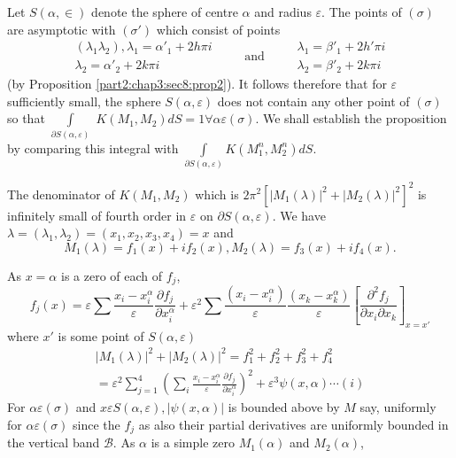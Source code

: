 Let $S(\alpha,  \in)$ denote the sphere of centre $\alpha$ and radius
$\varepsilon $. The points of $(\sigma)$ are asymptotic with $(\sigma')$ which
consist of points 
$$
\begin{aligned}
(\lambda_1\lambda_2), \lambda_1 = \alpha'_1 + 2h \pi i \\ 
  \lambda_2 = \alpha'_2+ 2 k \pi i
\end{aligned}
\qquad ~\text{and}~ \qquad 
\begin{aligned} 
  \lambda_1 = \beta'_1 + 2h' \pi i\\ 
  \lambda_2 =\beta'_2 + 2 k \pi i
\end{aligned}
$$ 
(by Proposition
    \ref{part2:chap3:sec8:prop2}). It follows therefore that for $\varepsilon $ sufficiently small, the
    sphere $S(\alpha,  \varepsilon)$ does not contain any other point of\pageoriginale
    $(\sigma)$ so that $\int  \limits_{\partial S (\alpha,  \varepsilon )}$ $K
    (M_1, M_2)dS = 1 \forall \alpha \varepsilon  (\sigma)$. We shall establish
    the proposition by comparing this integral with
    $\int \limits_{\partial S (\alpha,  \varepsilon )} K (M^n_1, M^n_2) dS$. 

The denominator of $K(M_1,  M_2)$ which is  $2 \pi^2 [|M_1
  (\lambda)|^2 + |M_2 (\lambda)|^2 ]^2$ is infinitely small of fourth
order in $\varepsilon  $ on $\partial S(\alpha,  \varepsilon )$. We have $\lambda =
(\lambda_1,  \lambda_2) = (x_1,  x_2, x_3, x_4) = x$ and  
$$
M_1 (\lambda ) = f_1 (x) + if_2 (x),  M_2(\lambda ) = f_3 (x) + if_4 (x). 
$$

As $x = \alpha$ is a zero of each of $f_j$,
$$
f_j (x) = \varepsilon  \sum \frac{x_i - x^\alpha_i }{\varepsilon } \frac{\partial
  f_j}{\partial x^\alpha_i} + \varepsilon ^2 \sum \frac{(x_i -
  x^\alpha_i)}{\varepsilon } \frac{(x_k- x_k^\alpha)}{\varepsilon}
\left[\frac{\partial^2 f_j}{\partial x_i \partial x_k}\right]_{x=x'} 
$$
where $x'$ is some point of $S(\alpha, \varepsilon )$
\begin{multline*}
  |M_1(\lambda)|^2 + | M_2 (\lambda) |^2 = f^2_1 + f^2_2 + f^2_3 +f^2_4\\
  = \varepsilon ^2 \sum^4_{j=1} \left(\sum_i \frac{ x_i - x^\alpha_i}{
    \varepsilon} \frac{\partial f_j}{\partial x^\alpha_i}\right)^2
  + \varepsilon^3 \psi (x, \alpha) \cdots (i)  
\end{multline*}
For $\alpha \varepsilon  (\sigma)$ and $x \varepsilon  S(\alpha,  \varepsilon ), |\psi (x,
\alpha)|$ is bounded above by $M$ say, uniformly for $\alpha \varepsilon 
(\sigma)$ since the $f_j$ as also their partial derivatives are
uniformly bounded in the vertical band $\mathscr{B}$. As $\alpha$ is a
simple zero $M_1(\alpha)$ and $M_2(\alpha)$, 


